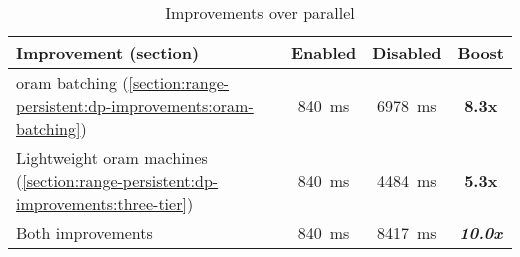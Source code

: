 \begin{table}[!ht]
	\begin{tabular*}{\linewidth}{ !{\extracolsep\fill} l c c >{\bfseries}c } %
		\toprule
			Improvement (section)													& Enabled					& Disabled					& Boost			\\
		\midrule
			\acrshort{oram} batching (\ref{section:range-persistent:dp-improvements:oram-batching})				& \SI{840}{\milli\second}	& \SI{6978}{\milli\second}	& 8.3x			\\
			Lightweight \acrshort{oram} machines (\ref{section:range-persistent:dp-improvements:three-tier})	& \SI{840}{\milli\second}	& \SI{4484}{\milli\second}	& 5.3x			\\
			Both improvements														& \SI{840}{\milli\second}	& \SI{8417}{\milli\second}	& \emph{10.0x}	\\
		\bottomrule
	\end{tabular*}
	\caption{Improvements over parallel \epsolute{}}%
	\label{table:optimizations}
\end{table}
